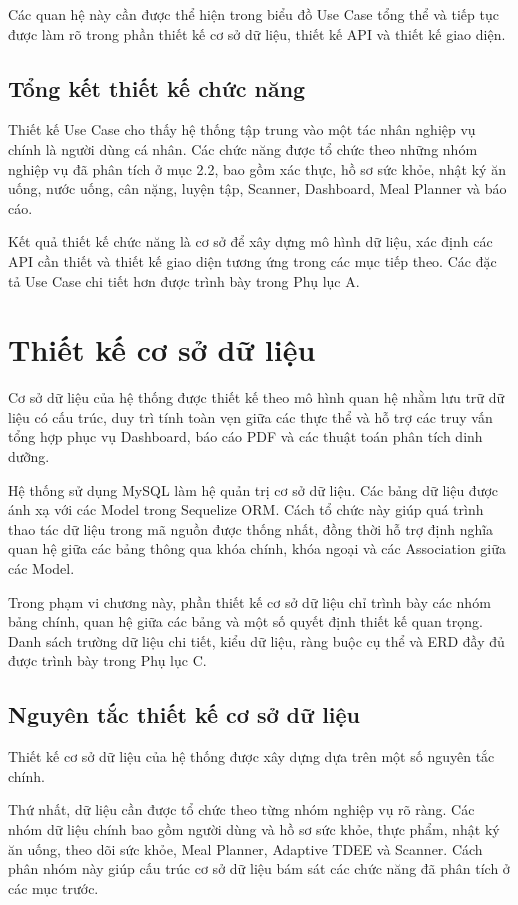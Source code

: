 \documentclass[12pt, a4paper]{report}
\begin{document}
Các quan hệ này cần được thể hiện trong biểu đồ Use Case tổng thể và tiếp tục được làm rõ trong phần thiết kế cơ sở dữ liệu, thiết kế API và thiết kế giao diện.

\subsection{Tổng kết thiết kế chức năng}Thiết kế Use Case cho thấy hệ thống tập trung vào một tác nhân nghiệp vụ chính là người dùng cá nhân. Các chức năng được tổ chức theo những nhóm nghiệp vụ đã phân tích ở mục 2.2, bao gồm xác thực, hồ sơ sức khỏe, nhật ký ăn uống, nước uống, cân nặng, luyện tập, Scanner, Dashboard, Meal Planner và báo cáo.

Kết quả thiết kế chức năng là cơ sở để xây dựng mô hình dữ liệu, xác định các API cần thiết và thiết kế giao diện tương ứng trong các mục tiếp theo. Các đặc tả Use Case chi tiết hơn được trình bày trong Phụ lục A.

\section{Thiết kế cơ sở dữ liệu}Cơ sở dữ liệu của hệ thống được thiết kế theo mô hình quan hệ nhằm lưu trữ dữ liệu có cấu trúc, duy trì tính toàn vẹn giữa các thực thể và hỗ trợ các truy vấn tổng hợp phục vụ Dashboard, báo cáo PDF và các thuật toán phân tích dinh dưỡng.

Hệ thống sử dụng MySQL làm hệ quản trị cơ sở dữ liệu. Các bảng dữ liệu được ánh xạ với các Model trong Sequelize ORM. Cách tổ chức này giúp quá trình thao tác dữ liệu trong mã nguồn được thống nhất, đồng thời hỗ trợ định nghĩa quan hệ giữa các bảng thông qua khóa chính, khóa ngoại và các Association giữa các Model.

Trong phạm vi chương này, phần thiết kế cơ sở dữ liệu chỉ trình bày các nhóm bảng chính, quan hệ giữa các bảng và một số quyết định thiết kế quan trọng. Danh sách trường dữ liệu chi tiết, kiểu dữ liệu, ràng buộc cụ thể và ERD đầy đủ được trình bày trong Phụ lục C.

\subsection{Nguyên tắc thiết kế cơ sở dữ liệu}Thiết kế cơ sở dữ liệu của hệ thống được xây dựng dựa trên một số nguyên tắc chính.

Thứ nhất, dữ liệu cần được tổ chức theo từng nhóm nghiệp vụ rõ ràng. Các nhóm dữ liệu chính bao gồm người dùng và hồ sơ sức khỏe, thực phẩm, nhật ký ăn uống, theo dõi sức khỏe, Meal Planner, Adaptive TDEE và Scanner. Cách phân nhóm này giúp cấu trúc cơ sở dữ liệu bám sát các chức năng đã phân tích ở các mục trước.
\end{document}
